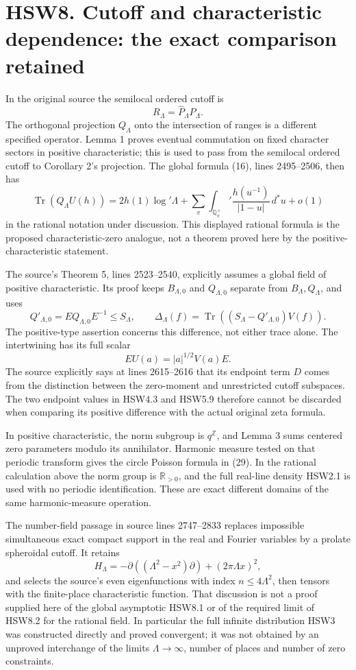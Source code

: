 \section{HSW8. Cutoff and characteristic dependence: the exact
comparison
retained}\label{hsw8.-cutoff-and-characteristic-dependence-the-exact-comparison-retained}

In the original source the semilocal ordered cutoff is \[
R_\Lambda=\widehat P_\Lambda P_\Lambda.
\] The orthogonal projection \(Q_\Lambda\) onto the intersection of
ranges is a different specified operator. Lemma 1 proves eventual
commutation on fixed character sectors in positive characteristic; this
is used to pass from the semilocal ordered cutoff to Corollary 2's
projection. The global formula (16), lines 2495--2506, then has \[
\operatorname{Tr}(Q_\Lambda U(h))
=2h(1)\log'\Lambda
+\sum_v\int_{\mathbb Q_v^\times}'\frac{h(u^{-1})}{|1-u|}\,d^*u+o(1)
\tag{HSW8.1}
\] in the rational notation under discussion. This displayed rational
formula is the proposed characteristic-zero analogue, not a theorem
proved here by the positive-characteristic statement.

The source's Theorem 5, lines 2523--2540, explicitly assumes a global
field of positive characteristic. Its proof keeps \(B_{\Lambda,0}\) and
\(Q_{\Lambda,0}\) separate from \(B_\Lambda,Q_\Lambda\), and uses \[
Q'_{\Lambda,0}=E Q_{\Lambda,0}E^{-1}\le S_\Lambda,\qquad
\Delta_\Lambda(f)=
\operatorname{Tr}((S_\Lambda-Q'_{\Lambda,0})V(f)).
\tag{HSW8.2}
\] The positive-type assertion concerns this difference, not either
trace alone. The intertwining has its full scalar \[
EU(a)=|a|^{1/2}V(a)E.
\tag{HSW8.3}
\] The source explicitly says at lines 2615--2616 that its endpoint term
\(D\) comes from the distinction between the zero-moment and
unrestricted cutoff subspaces. The two endpoint values in HSW4.3 and
HSW5.9 therefore cannot be discarded when comparing its positive
difference with the actual original zeta formula.

In positive characteristic, the norm subgroup is \(q^{\mathbb Z}\), and
Lemma 3 sums centered zero parameters modulo its annihilator. Harmonic
measure tested on that periodic transform gives the circle Poisson
formula in (29). In the rational calculation above the norm group is
\(\mathbb R_{>0}\), and the full real-line density HSW2.1 is used with
no periodic identification. These are exact different domains of the
same harmonic-measure operation.

The number-field passage in source lines 2747--2833 replaces impossible
simultaneous exact compact support in the real and Fourier variables by
a prolate spheroidal cutoff. It retains \[
H_\Lambda=-\partial((\Lambda^2-x^2)\partial)+(2\pi\Lambda x)^2,
\] and selects the source's even eigenfunctions with index
\(n\le4\Lambda^2\), then tensors with the finite-place characteristic
function. That discussion is not a proof supplied here of the global
asymptotic HSW8.1 or of the required limit of HSW8.2 for the rational
field. In particular the full infinite distribution HSW3 was constructed
directly and proved convergent; it was not obtained by an unproved
interchange of the limits \(\Lambda\to\infty\), number of places and
number of zero constraints.

